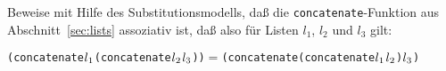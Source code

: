 \begin{aufgabe}
 Beweise mit Hilfe des Substitutionsmodells, daß
  die \texttt{concatenate}-Funktion aus Abschnitt~\ref{sec:lists}
  assoziativ ist, daß also für Listen $l_1$, $l_2$ und $l_3$ gilt:
\begin{alltt}
(concatenate \(l\sb{1}\) (concatenate \(l\sb{2}\) \(l\sb{3}\))) \(=\) (concatenate (concatenate \(l\sb{1}\) \(l\sb{2}\)) \(l\sb{3}\))
\end{alltt}
\end{aufgabe}



